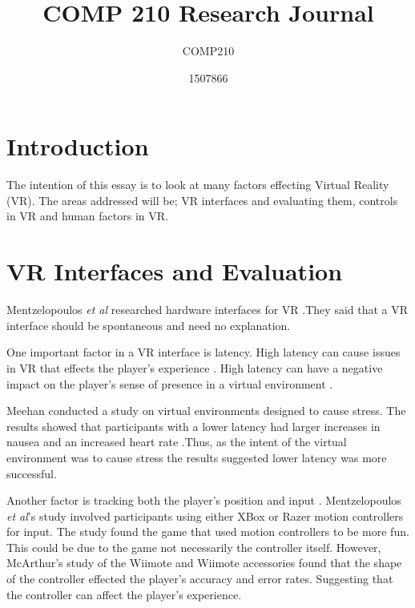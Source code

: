 \documentclass{scrartcl}
\title{COMP 210 Research Journal}
\subtitle{COMP210}
\author{1507866}
\begin{document}
	
\maketitle
	

\section{Introduction}
The intention of this essay is to look at many factors effecting Virtual Reality (VR). The areas addressed will be; VR interfaces and evaluating them, controls in VR and  human factors in VR. 
	
\section{VR Interfaces and Evaluation}
Mentzelopoulos \textit{et al} researched hardware interfaces for VR \cite{Mentzelopoulos}.They said that a VR interface should be spontaneous and need no explanation. 
\bigskip  

One important factor in a VR interface is latency. High latency can cause issues in VR that effects the player's experience \cite{Mentzelopoulos, Meehan}. High latency can have a negative impact on the player's sense of presence in a virtual environment \cite{Meehan}. 
 
\bigskip 
 
Meehan conducted a study on virtual environments designed to cause stress. The results showed that participants with a lower latency had larger increases in nausea and an increased heart rate \cite{Meehan}.Thus,  as the intent of the virtual environment was to cause stress the results suggested lower latency was more successful.

\bigskip

Another factor is tracking both the player's position and input \cite{Mentzelopoulos}. Mentzelopoulos \textit{et al}'s study involved participants using either XBox or Razer motion controllers for input. The study found the game that used motion controllers to be more fun. This could be due to the game not necessarily the controller itself.  However, McArthur's study of the Wiimote and  Wiimote accessories found that the shape of the controller effected the player's accuracy and error rates.  Suggesting that the controller can affect the player's experience.
\end{document}
